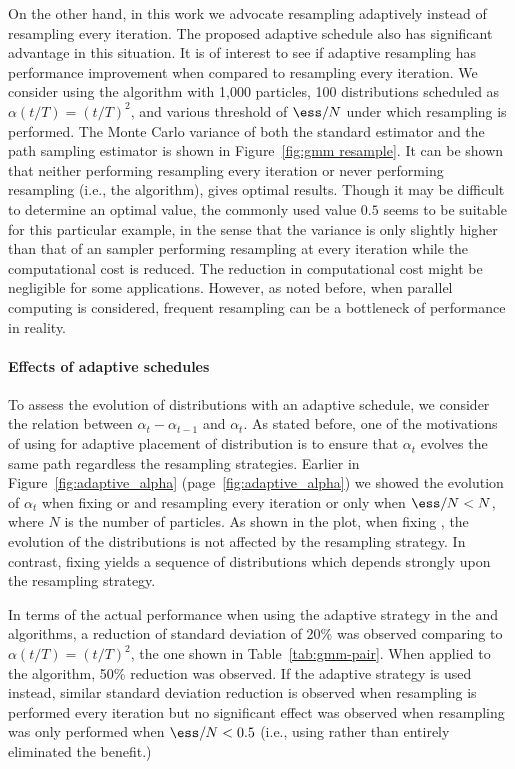 On the other hand, in this work we advocate resampling adaptively instead of
resampling every iteration. The proposed adaptive schedule also has
significant advantage in this situation. It is of interest to see if adaptive
resampling has performance improvement when compared to resampling every
iteration. We consider using the \smc[2] algorithm with 1,000 particles, 100
distributions scheduled as $\alpha(t/T) = (t/T)^2$, and various threshold of
$\ess/N$ under which resampling is performed. The Monte Carlo variance of both
the standard estimator and the path sampling estimator is shown in
Figure~\ref{fig:gmm resample}. It can be shown that neither performing
resampling every iteration or never performing resampling (i.e., the \ais
algorithm), gives optimal results. Though it may be difficult to determine an
optimal value, the commonly used value $0.5$ seems to be suitable for this
particular example, in the sense that the variance is only slightly higher
than that of an sampler performing resampling at every iteration while the
computational cost is reduced. The reduction in computational cost might be
negligible for some applications. However, as noted before, when parallel
computing is considered, frequent resampling can be a bottleneck of
performance in reality.

\paragraph{Effects of adaptive schedules}

To assess the evolution of distributions with an adaptive schedule, we
consider the relation between $\alpha_t - \alpha_{t-1}$ and $\alpha_t$. As
stated before, one of the motivations of using \cess for adaptive placement of
distribution is to ensure that $\alpha_t$ evolves the same path regardless the
resampling strategies. Earlier in Figure~\ref{fig:adaptive_alpha}
(page~\ref{fig:adaptive_alpha}) we showed the evolution of $\alpha_t$ when
fixing \ess or \cess and resampling every iteration or only when $\ess/N < N$,
where $N$ is the number of particles. As shown in the plot, when fixing \cess,
the evolution of the distributions is not affected by the resampling strategy.
In contrast, fixing \ess yields a sequence of distributions which depends
strongly upon the resampling strategy.

In terms of the actual performance when using the \cess adaptive strategy in
the \smc[2] and \ais algorithms, a reduction of standard deviation of 20\% was
observed comparing to $\alpha(t/T) = (t/T)^2$, the one shown in
Table~\ref{tab:gmm-pair}. When applied to the \smc[3] algorithm, 50\%
reduction was observed. If the \ess adaptive strategy is used instead, similar
standard deviation reduction is observed when resampling is performed every
iteration but no significant effect was observed when resampling was only
performed when $\ess/N < 0.5$ (i.e., using \ess rather than \cess entirely
eliminated the benefit.)

